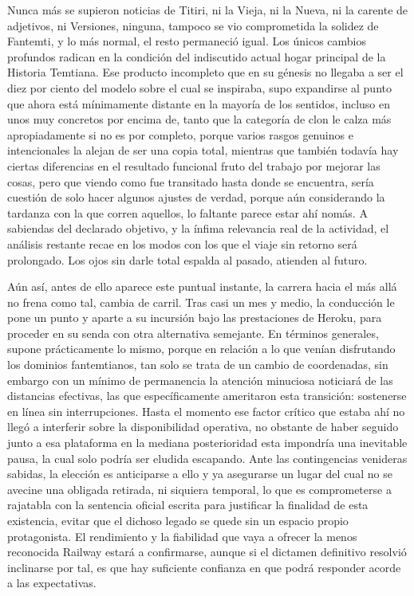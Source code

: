 \documentclass[
]{book}
\begin{document}
Nunca más se supieron noticias de Titiri, ni la Vieja, ni la Nueva, ni la carente de adjetivos, ni Versiones, ninguna, tampoco se vio comprometida la solidez de Fantemti, y lo más normal, el resto permaneció igual. Los únicos cambios profundos radican en la condición del indiscutido actual hogar principal de la Historia Temtiana. Ese producto incompleto que en su génesis no llegaba a ser el diez por ciento del modelo sobre el cual se inspiraba, supo expandirse al punto que ahora está mínimamente distante en la mayoría de los sentidos, incluso en unos muy concretos por encima de, tanto que la categoría de clon le calza más apropiadamente si no es por completo, porque varios rasgos genuinos e intencionales la alejan de ser una copia total, mientras que también todavía hay ciertas diferencias en el resultado funcional fruto del trabajo por mejorar las cosas, pero que viendo como fue transitado hasta donde se encuentra, sería cuestión de solo hacer algunos ajustes de verdad, porque aún considerando la tardanza con la que corren aquellos, lo faltante parece estar ahí nomás. A sabiendas del declarado objetivo, y la ínfima relevancia real de la actividad, el análisis restante recae en los modos con los que el viaje sin retorno será prolongado. Los ojos sin darle total espalda al pasado, atienden al futuro.

Aún así, antes de ello aparece este puntual instante, la carrera hacia el más allá no frena como tal, cambia de carril. Tras casi un mes y medio, la conducción le pone un punto y aparte a su incursión bajo las prestaciones de Heroku, para proceder en su senda con otra alternativa semejante. En términos generales, supone prácticamente lo mismo, porque en relación a lo que venían disfrutando los dominios fantemtianos, tan solo se trata de un cambio de coordenadas, sin embargo con un mínimo de permanencia la atención minuciosa noticiará de las distancias efectivas, las que específicamente ameritaron esta transición: sostenerse en línea sin interrupciones. Hasta el momento ese factor crítico que estaba ahí no llegó a interferir sobre la disponibilidad operativa, no obstante de haber seguido junto a esa plataforma en la mediana posterioridad esta impondría una inevitable pausa, la cual solo podría ser eludida escapando. Ante las contingencias venideras sabidas, la elección es anticiparse a ello y ya asegurarse un lugar del cual no se avecine una obligada retirada, ni siquiera temporal, lo que es comprometerse a rajatabla con la sentencia oficial escrita para justificar la finalidad de esta existencia, evitar que el dichoso legado se quede sin un espacio propio protagonista. El rendimiento y la fiabilidad que vaya a ofrecer la menos reconocida Railway estará a confirmarse, aunque si el dictamen definitivo resolvió inclinarse por tal, es que hay suficiente confianza en que podrá responder acorde a las expectativas.
\end{document}
